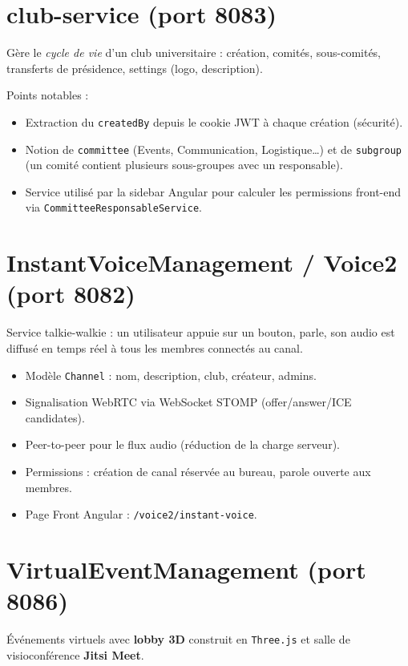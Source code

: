 \documentclass[11pt,a4paper]{report}
\begin{document}
\section{club-service (port 8083)}

Gère le \textit{cycle de vie} d'un club universitaire : création, comités,
sous-comités, transferts de présidence, settings (logo, description).

Points notables :
\begin{itemize}
  \item Extraction du \texttt{createdBy} depuis le cookie JWT à chaque création
        (sécurité).
  \item Notion de \texttt{committee} (Events, Communication, Logistique\ldots)
        et de \texttt{subgroup} (un comité contient plusieurs sous-groupes
        avec un responsable).
  \item Service utilisé par la sidebar Angular pour calculer les permissions
        front-end via \texttt{CommitteeResponsableService}.
\end{itemize}

\section{InstantVoiceManagement / Voice2 (port 8082)}

Service \og talkie-walkie \fg : un utilisateur appuie sur un bouton, parle, son
audio est diffusé en temps réel à tous les membres connectés au canal.

\begin{itemize}
  \item Modèle \texttt{Channel} : nom, description, club, créateur, admins.
  \item Signalisation WebRTC via WebSocket STOMP (offer/answer/ICE candidates).
  \item Peer-to-peer pour le flux audio (réduction de la charge serveur).
  \item Permissions : création de canal réservée au bureau, parole ouverte aux
        membres.
  \item Page Front Angular : \texttt{/voice2/instant-voice}.
\end{itemize}

\section{VirtualEventManagement (port 8086)}

Événements virtuels avec \textbf{lobby 3D} construit en \texttt{Three.js} et
salle de visioconférence \textbf{Jitsi Meet}.
\end{document}
